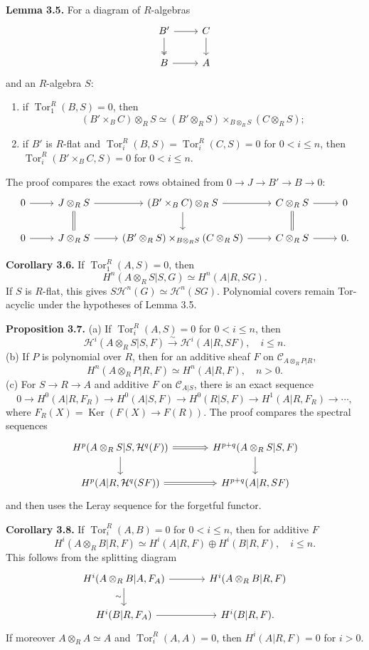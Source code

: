 \documentclass[11pt]{article}
\providecommand{\Tor}{\operatorname{Tor}}
\providecommand{\Ker}{\operatorname{Ker}}
\providecommand{\cC}{\mathcal C}
\providecommand{\cH}{\mathcal H}
\begin{document}
\textbf{Lemma 3.5.}  For a diagram of \(R\)-algebras
\[
\begin{tikzcd}
B' \arrow[r] \arrow[d,two heads] & C \arrow[d] \\
B \arrow[r] & A
\end{tikzcd}
\]
and an \(R\)-algebra \(S\):
\begin{enumerate}[label=\textup{(\roman*)}]
\item if \(\Tor^R_1(B,S)=0\), then
\[
(B'\times_BC)\otimes_RS \simeq (B'\otimes_RS)\times_{B\otimes_RS}(C\otimes_RS);
\]
\item if \(B'\) is \(R\)-flat and \(\Tor_i^R(B,S)=\Tor_i^R(C,S)=0\) for \(0<i\le n\), then \(\Tor_i^R(B'\times_BC,S)=0\) for \(0<i\le n\).
\end{enumerate}
The proof compares the exact rows obtained from \(0\to J\to B'\to B\to0\):
\[
\begin{tikzcd}
0\arrow[r]&J\otimes_RS\arrow[r]\arrow[d,equal]&(B'\times_BC)\otimes_RS\arrow[r]\arrow[d]&C\otimes_RS\arrow[r]\arrow[d,equal]&0\\
0\arrow[r]&J\otimes_RS\arrow[r]&(B'\otimes_RS)\times_{B\otimes_RS}(C\otimes_RS)\arrow[r]&C\otimes_RS\arrow[r]&0.
\end{tikzcd}
\]

\textbf{Corollary 3.6.}  If \(\Tor^R_1(A,S)=0\), then
\[
H^n(A\otimes_RS|S,G)\simeq H^n(A|R,SG).
\]
If \(S\) is \(R\)-flat, this gives \(S\cH^n(G)\simeq\cH^n(SG)\).  Polynomial covers remain Tor-acyclic under the hypotheses of Lemma 3.5.

\textbf{Proposition 3.7.}  (a) If \(\Tor_i^R(A,S)=0\) for \(0<i\le n\), then
\[
\cH^i(A\otimes_RS|S,F)\xrightarrow{\sim}\cH^i(A|R,SF),\quad i\le n.
\]
(b) If \(P\) is polynomial over \(R\), then for an additive sheaf \(F\) on \(\cC_{A\otimes_RP|R}\),
\[
H^n(A\otimes_RP|R,F)\simeq H^n(A|R,F),\quad n>0.
\]
(c) For \(S\to R\to A\) and additive \(F\) on \(\cC_{A|S}\), there is an exact sequence
\[
0\to H^0(A|R,F_R)\to H^0(A|S,F)\to H^0(R|S,F)\to H^1(A|R,F_R)\to\cdots,
\]
where \(F_R(X)=\Ker(F(X)\to F(R))\).  The proof compares the spectral sequences
\[
\begin{tikzcd}[column sep=large]
H^p(A\otimes_RS|S,\cH^q(F)) \arrow[r,Rightarrow] \arrow[d] & H^{p+q}(A\otimes_RS|S,F) \arrow[d] \\
H^p(A|R,\cH^q(SF)) \arrow[r,Rightarrow] & H^{p+q}(A|R,SF)
\end{tikzcd}
\]
and then uses the Leray sequence for the forgetful functor.

\textbf{Corollary 3.8.}  If \(\Tor_i^R(A,B)=0\) for \(0<i\le n\), then for additive \(F\)
\[
H^i(A\otimes_RB|R,F)\simeq H^i(A|R,F)\oplus H^i(B|R,F),\quad i\le n.
\]
This follows from the splitting diagram
\[
\begin{tikzcd}[column sep=large]
H^i(A\otimes_RB|A,F_A) \arrow[r] \arrow[d,"\sim"'] & H^i(A\otimes_RB|R,F) \\
H^i(B|R,F_A) \arrow[r] & H^i(B|R,F).
\end{tikzcd}
\]
If moreover \(A\otimes_RA\simeq A\) and \(\Tor_i^R(A,A)=0\), then \(H^i(A|R,F)=0\) for \(i>0\).
\end{document}
